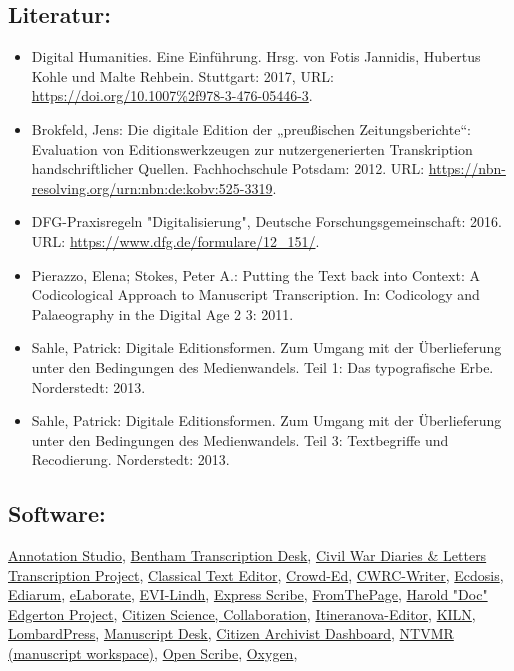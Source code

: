 \documentclass{article}
\begin{document}
        \subsection*{Literatur:}\begin{itemize}\item Digital Humanities. Eine Einführung. Hrsg. von Fotis Jannidis, Hubertus Kohle und Malte Rehbein. Stuttgart: 2017, URL: \url{https://doi.org/10.1007%2f978-3-476-05446-3}.\item Brokfeld, Jens: Die digitale Edition der „preußischen Zeitungsberichte“: Evaluation von Editionswerkzeugen zur nutzergenerierten Transkription handschriftlicher Quellen. Fachhochschule Potsdam: 2012. URL: \url{https://nbn-resolving.org/urn:nbn:de:kobv:525-3319}.\item DFG-Praxisregeln "Digitalisierung", Deutsche Forschungsgemeinschaft: 2016. URL: \url{https://www.dfg.de/formulare/12_151/}.\item Pierazzo, Elena; Stokes, Peter A.: Putting the Text back into Context: A Codicological Approach to Manuscript Transcription. In: Codicology and Palaeography in the Digital Age 2 3: 2011.\item Sahle, Patrick: Digitale Editionsformen. Zum Umgang mit der Überlieferung unter den Bedingungen des Medienwandels. Teil 1: Das typografische Erbe. Norderstedt: 2013.\item Sahle, Patrick: Digitale Editionsformen. Zum Umgang mit der Überlieferung unter den Bedingungen des Medienwandels. Teil 3: Textbegriffe und Recodierung. Norderstedt: 2013.\end{itemize}\subsection*{Software:}\href{https://www.annotationstudio.org/}{Annotation Studio}, \href{http://transcribe-bentham.ucl.ac.uk/td/Transcribe_Bentham}{Bentham Transcription Desk}, \href{https://diyhistory.lib.uiowa.edu}{Civil War Diaries & Letters Transcription Project}, \href{http://cte.oeaw.ac.at/}{Classical Text Editor}, \href{https://github.com/gsbodine/crowd-ed}{Crowd-Ed}, \href{https://wiki.tei-c.org/index.php/CWRC-Writer}{CWRC-Writer}, \href{https://ecdosis.rocks/Home/}{Ecdosis}, \href{http://www.bbaw.de/telota/software/ediarum}{Ediarum}, \href{https://www.e-laborate.nl/en/}{eLaborate}, \href{http://linhd.es/en/}{EVI-Lindh}, \href{https://www.nch.com.au/scribe/index.html}{Express Scribe}, \href{https://fromthepage.com/}{FromThePage}, \href{http://edgerton-digital-collections.org/notebooks}{Harold "Doc" Edgerton Project}, \href{https://islandora.ca/}{Citizen Science, Collaboration}, \href{http://www.mom-wiki.uni-koeln.de/}{Itineranova-Editor}, \href{https://kcl-ddh.github.io/kiln/}{KILN}, \href{http://lombardpress.org/}{LombardPress}, \href{https://manuscriptdesk.uantwerpen.be/md/Main_Page}{Manuscript Desk}, \href{https://www.archives.gov/citizen-archivist/missions}{Citizen Archivist Dashboard}, \href{http://ntvmr.uni-muenster.de/de/manuscript-workspace}{NTVMR (manuscript workspace)}, \href{http://code.google.com/p/openscribe/}{Open Scribe}, \href{http://oxygenxml.com/}{Oxygen}, 
\end{document}
